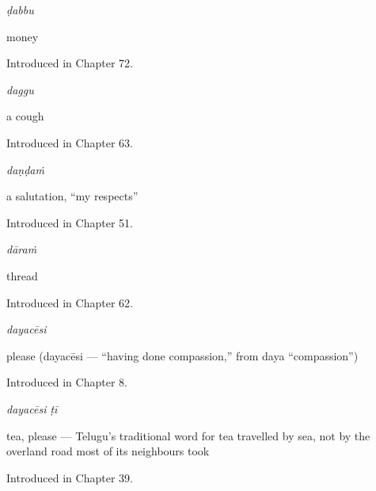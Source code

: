 \noindent\begin{minipage}[t]{\linewidth}
\raggedright
\textbf{}\enspace\emph{ḍabbu}\par
\small money\par
\footnotesize Introduced in Chapter 72.
\end{minipage}\par\medskip

\noindent\begin{minipage}[t]{\linewidth}
\raggedright
\textbf{}\enspace\emph{daggu}\par
\small a cough\par
\footnotesize Introduced in Chapter 63.
\end{minipage}\par\medskip

\noindent\begin{minipage}[t]{\linewidth}
\raggedright
\textbf{}\enspace\emph{daṇḍaṁ}\par
\small a salutation, \textquotedblleft{}my respects\textquotedblright{}\par
\footnotesize Introduced in Chapter 51.
\end{minipage}\par\medskip

\noindent\begin{minipage}[t]{\linewidth}
\raggedright
\textbf{}\enspace\emph{dāraṁ}\par
\small thread\par
\footnotesize Introduced in Chapter 62.
\end{minipage}\par\medskip

\noindent\begin{minipage}[t]{\linewidth}
\raggedright
\textbf{}\enspace\emph{dayacēsi}\par
\small please (dayacēsi — \textquotedblleft{}having done compassion,\textquotedblright{} from  daya \textquotedblleft{}compassion\textquotedblright{})\par
\footnotesize Introduced in Chapter 8.
\end{minipage}\par\medskip

\noindent\begin{minipage}[t]{\linewidth}
\raggedright
\textbf{ }\enspace\emph{dayacēsi ṭī}\par
\small tea, please — Telugu's traditional word for tea travelled by sea, not by the overland road most of its neighbours took\par
\footnotesize Introduced in Chapter 39.
\end{minipage}\par\medskip

